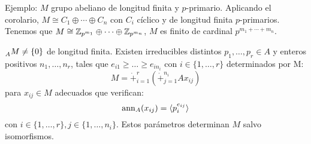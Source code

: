 Ejemplo: \(M\) grupo abeliano de longitud finita y \(p\)-primario.
Aplicando el corolario, \(M\cong C_1\oplus\cdots\oplus C_n\) con
\(C_i\) cíclico y de longitud finita \(p\)-primarios.
Tenemos que \(M\cong \mathbb{Z}_{p^{m_1}}\oplus\cdots\oplus\mathbb{Z}_{p^{m_n}}\),
\(M\) es finito de cardinal \(p^{m_1+\cdots+m_n}\).

\begin{teo}
  \(\prescript{}{A}{M}\neq\{0\}\) de longitud finita. Existen
  irreducibles distintos \(p_1,\ldots,p_r\in A\) y enteros positivos
  \(n_1,\ldots, n_r\), tales que \(e_{i1}\ge\ldots\ge e_{in_i}\) con
  \(i\in\{1,\ldots,r\}\) determinados por M:\@
  \[
    M=\dot{+}_{i=1}^r\left(\dot{+}_{j=1}^{n_i} Ax_{ij}\right)
  \]
  para \(x_{ij}\in M\) adecuados que verifican:
  \[
    \operatorname{ann}_A(x_{ij})=\langle p_i^{e_{ij}}\rangle
  \]
  con \(i\in\{1,\ldots,r\}, j\in\{1,\ldots, n_i\}\). Estos parámetros
  determinan \(M\) salvo isomorfismos.
\end{teo}
